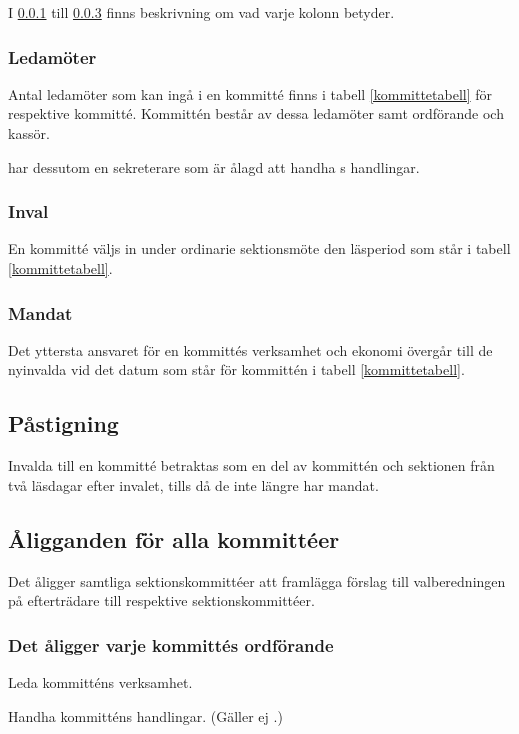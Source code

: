 I \ref{ledmot} till \ref{mandat} finns beskrivning om vad varje kolonn betyder. 

\subsubsection{Ledamöter} \label{ledmot}
Antal ledamöter som kan ingå i en kommitté finns i tabell \ref{kommittetabell} för respektive kommitté. Kommittén består av dessa ledamöter samt ordförande och kassör. 

\ARMIT{} har dessutom en sekreterare som är ålagd att handha \ARMIT{}s handlingar. 

\subsubsection{Inval}
En kommitté väljs in under ordinarie sektionsmöte den läsperiod som står i tabell \ref{kommittetabell}. 

\subsubsection{Mandat} \label{mandat}
Det yttersta ansvaret för en kommittés verksamhet och ekonomi övergår till de nyinvalda vid det datum som står för kommittén i tabell \ref{kommittetabell}.

\subsection{Påstigning}

Invalda till en kommitté betraktas som en del av kommittén och sektionen från två läsdagar efter invalet, tills då de inte längre har mandat.

\subsection{Åligganden för alla kommittéer}
Det åligger samtliga sektionskommittéer att framlägga förslag till valberedningen på efterträdare till respektive sektionskommittéer. 

\subsubsection{Det åligger varje kommittés ordförande}
\begin{att}
	\item Leda kommitténs verksamhet.
	\item Handha kommitténs handlingar. (Gäller ej \ARMIT{}.)
\end{att}

